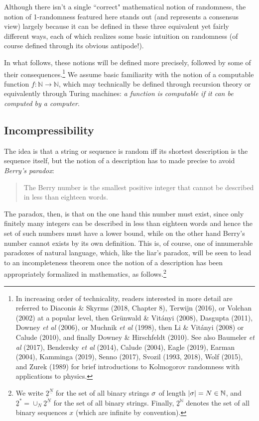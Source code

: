 \documentclass[11pt,a4paper]{article}
\numberwithin{equation}{section}
\newcommand{\ul}{\underline}
\newcommand{\raw}{\rightarrow}
\newcommand{\N}{{\mathbb N}} \newcommand{\R}{{\mathbb R}}
\begin{document}
 
  Although there 
  isn't a single ``correct" mathematical notion of randomness, the notion of 1-randomness featured here stands out (and represents a consensus view) largely because 
 it can be defined in these three equivalent yet fairly different ways, each of which realizes some basic intuition on randomness (of course defined through its obvious antipode!). 
 
 In what follows,  these notions will be defined more precisely, followed by some of their consequences.\footnote{In increasing order of technicality, readers interested in more detail are referred to Diaconis \& Skyrms (2018, Chapter 8), Terwijn (2016), or Volchan (2002) at a popular level, then Gr\"{u}nwald \& Vit\'{a}nyi (2008), Dasgupta (2011),   Downey \emph{et al} (2006), or Muchnik \emph{et al} (1998), then Li \& Vit\'{a}nyi (2008) or Calude (2010), and finally Downey \& Hirschfeldt (2010).
See also  Baumeler  \emph{et al} (2017),  Bendersky \emph{et al}  (2014), 
Calude (2004),  Eagle  (2019), Earman (2004), Kamminga (2019), Senno (2017), Svozil (1993, 2018),  Wolf (2015), and Zurek (1989) for brief introductions to Kolmogorov randomness with  applications to  physics.} We assume basic familiarity with the notion of a computable function $f:\N\raw\N$, which may technically be defined  through recursion theory or equivalently through Turing machines: \emph{a function is computable if it can  be computed by a computer}.    
\subsection*{Incompressibility}
The idea is that a string or sequence is random iff its shortest description is the sequence itself, but the notion of a description has to made precise to avoid \emph{Berry's paradox}:
\begin{quote}\begin{small}
The Berry number is the smallest positive integer that cannot be described in less than eighteen words.
\end{small}\end{quote}
The paradox, then, is that on the one hand this number must exist, since only finitely many integers can be described in less than eighteen words and hence the set of such numbers must have a lower bound, while on the other hand Berry's number cannot exists by its own definition. This is, of course, one of innumerable paradoxes of natural language, which, like the liar's paradox, will be seen to lead to an incompleteness theorem once the notion of a description has been appropriately formalized in mathematics, as follows.\footnote{We write $\ul{2}^{\ul{N}}$ for the set of all binary strings $\sigma$  of length $|\sg|=N\in\N$, and $\ul{2}^*=\cup_N\ul{2}^{\ul{N}}$ for the set of all binary strings. Finally, 
  $\ul{2}^{\N}$ denotes the set of all binary sequences $x$  (which are infinite by convention). }
\end{document}
